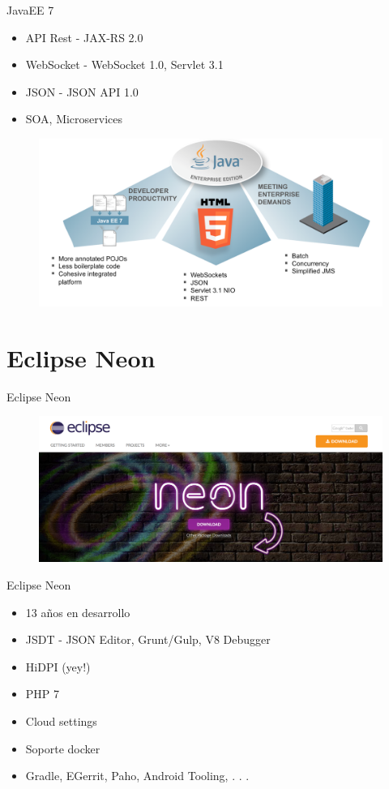 \documentclass{beamer}
\begin{document}
\begin{frame}{JavaEE 7}
	\begin{itemize}
		\item API Rest - JAX-RS 2.0
		\item WebSocket - WebSocket 1.0, Servlet 3.1
		\item JSON - JSON API 1.0
		\item SOA, Microservices
	\end{itemize}
	\begin{figure}
		\centering
		\includegraphics[width=0.65\linewidth]{Images/javaee7-theme}
	\end{figure}
\end{frame}

\section{Eclipse Neon}
\begin{frame}{Eclipse Neon}
	\begin{figure}
		\centering
		\includegraphics[width=0.90\linewidth]{Images/neon}
	\end{figure}
\end{frame}

\begin{frame}{Eclipse Neon}
	\begin{itemize}
		\item 13 años en desarrollo
		\item JSDT - JSON Editor, Grunt/Gulp, V8 Debugger
		\item HiDPI (yey!)
		\item PHP 7
		\item Cloud settings
		\item Soporte docker
		\item Gradle, EGerrit, Paho, Android Tooling, . . .
	\end{itemize}
\end{frame}
\end{document}
